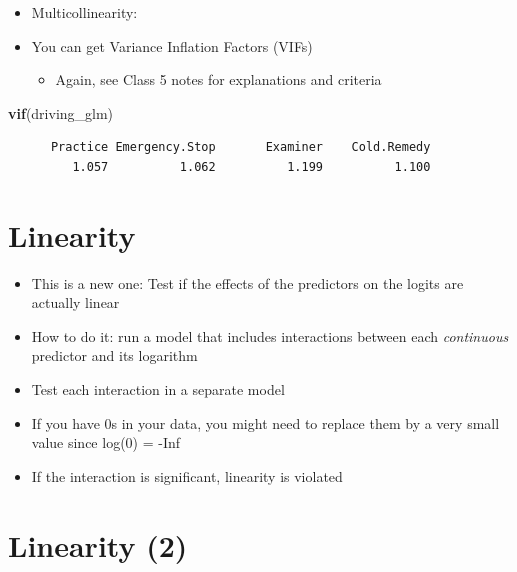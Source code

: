 \documentclass[]{article}
\newenvironment{Shaded}{}{}
\newcommand{\KeywordTok}[1]{\textcolor[rgb]{0.00,0.44,0.13}{\textbf{{#1}}}}
\newcommand{\NormalTok}[1]{{#1}}
\begin{document}
\begin{itemize}
\itemsep1pt\parskip0pt
\item
  Multicollinearity:
\item
  You can get Variance Inflation Factors (VIFs)

  \begin{itemize}
  \itemsep1pt\parskip0pt
  \item
    Again, see Class 5 notes for explanations and criteria
  \end{itemize}
\end{itemize}

\begin{Shaded}
\begin{Highlighting}[]
\KeywordTok{vif}\NormalTok{(driving_glm)}
\end{Highlighting}
\end{Shaded}

\begin{verbatim}
      Practice Emergency.Stop       Examiner    Cold.Remedy 
         1.057          1.062          1.199          1.100 
\end{verbatim}

\section{Linearity}\label{linearity}

\begin{itemize}
\itemsep1pt\parskip0pt
\item
  This is a new one: Test if the effects of the predictors on the logits
  are actually linear
\item
  How to do it: run a model that includes interactions between each
  \emph{continuous} predictor and its logarithm
\item
  Test each interaction in a separate model
\item
  If you have 0s in your data, you might need to replace them by a very
  small value since log(0) = -Inf
\item
  If the interaction is significant, linearity is violated
\end{itemize}

\section{Linearity (2)}\label{linearity-2}
\end{document}
